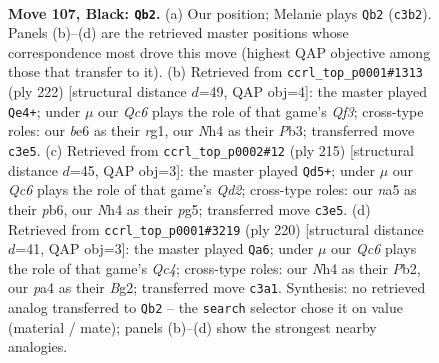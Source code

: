 \documentclass[11pt]{article}
\begin{document}
\clearpage

\begin{figure}[p]\centering
\begin{subfigure}{0.46\textwidth}\centering
\resizebox{\linewidth}{!}{%
\newchessgame
\chessboard[
  setfen={8/6k1/n3B3/N7/Pp2P2n/2q5/5b1p/3K4 b - - 7 107},
  showmover=false,
  pgfstyle=straightmove, color=movearrow, markmove={c3-b2}
]}
\caption{}
\end{subfigure}\hfill
\begin{subfigure}{0.46\textwidth}\centering
\resizebox{\linewidth}{!}{%
\newchessgame
\chessboard[
  setfen={8/8/5K2/p7/1p5k/1P3Q2/P6p/6r1 w - - 19 112},
  showmover=false,
  pgfstyle=straightmove, color=movearrow, markmove={f3-e4}
]}
\caption{}
\end{subfigure}
\\[4pt]
\begin{subfigure}{0.46\textwidth}\centering
\resizebox{\linewidth}{!}{%
\newchessgame
\chessboard[
  setfen={K7/3q3k/1P4p1/6P1/7p/5P2/8/5Q2 b - - 6 108},
  showmover=false,
  pgfstyle=straightmove, color=movearrow, markmove={d7-d5}
]}
\caption{}
\end{subfigure}\hfill
\begin{subfigure}{0.46\textwidth}\centering
\resizebox{\linewidth}{!}{%
\newchessgame
\chessboard[
  setfen={5k2/3q4/5b2/8/2Q5/2P3p1/KP4B1/8 w - - 10 111},
  showmover=false,
  pgfstyle=straightmove, color=movearrow, markmove={c4-a6}
]}
\caption{}
\end{subfigure}
\caption{\textbf{Move 107, Black: \texttt{Qb2}.} (a) Our position; Melanie plays \texttt{Qb2} (\texttt{c3b2}). Panels (b)--(d) are the retrieved master positions whose correspondence most drove this move (highest QAP objective among those that transfer to it). (b) Retrieved from \texttt{ccrl\_top\_p0001\#1313} (ply 222) [structural distance $d$=49, QAP obj=4]: the master played \texttt{Qe4+}; under $\mu$ our \emph{Qc6} plays the role of that game's \emph{Qf3}; cross-type roles: our \emph{b}e6 as their \emph{r}g1, our \emph{N}h4 as their \emph{P}b3; transferred move \texttt{c3e5}. (c) Retrieved from \texttt{ccrl\_top\_p0002\#12} (ply 215) [structural distance $d$=45, QAP obj=3]: the master played \texttt{Qd5+}; under $\mu$ our \emph{Qc6} plays the role of that game's \emph{Qd2}; cross-type roles: our \emph{n}a5 as their \emph{p}b6, our \emph{N}h4 as their \emph{p}g5; transferred move \texttt{c3e5}. (d) Retrieved from \texttt{ccrl\_top\_p0001\#3219} (ply 220) [structural distance $d$=41, QAP obj=3]: the master played \texttt{Qa6}; under $\mu$ our \emph{Qc6} plays the role of that game's \emph{Qc4}; cross-type roles: our \emph{N}h4 as their \emph{P}b2, our \emph{p}a4 as their \emph{B}g2; transferred move \texttt{c3a1}. Synthesis: no retrieved analog transferred to \texttt{Qb2} -- the \texttt{search} selector chose it on value (material / mate); panels (b)--(d) show the strongest nearby analogies.}
\label{fig:thought-m213}
\end{figure}
\end{document}
